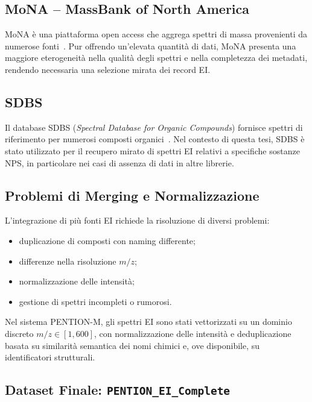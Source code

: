 \subsection{MoNA -- MassBank of North America}
\label{subsec:mona}

MoNA è una piattaforma open access che aggrega spettri di massa provenienti da numerose fonti~\cite{mona}.
Pur offrendo un’elevata quantità di dati, MoNA presenta una maggiore eterogeneità nella qualità degli spettri e nella completezza dei metadati, rendendo necessaria una selezione mirata dei record EI.

\subsection{SDBS}
\label{subsec:sdbs}

Il database SDBS (\emph{Spectral Database for Organic Compounds}) fornisce spettri di riferimento per numerosi composti organici~\cite{sdbs}.
Nel contesto di questa tesi, SDBS è stato utilizzato per il recupero mirato di spettri EI relativi a specifiche sostanze NPS, in particolare nei casi di assenza di dati in altre librerie.

\subsection{Problemi di Merging e Normalizzazione}
\label{subsec:merging}

L’integrazione di più fonti EI richiede la risoluzione di diversi problemi:
\begin{itemize}
	\item duplicazione di composti con naming differente;
	\item differenze nella risoluzione $m/z$;
	\item normalizzazione delle intensità;
	\item gestione di spettri incompleti o rumorosi.
\end{itemize}

Nel sistema PENTION-M, gli spettri EI sono stati vettorizzati su un dominio discreto $m/z \in [1,600]$, con normalizzazione delle intensità e deduplicazione basata su similarità semantica dei nomi chimici e, ove disponibile, su identificatori strutturali.

\subsection{Dataset Finale: \texttt{PENTION\_EI\_Complete}}
\label{subsec:pention_dataset}

